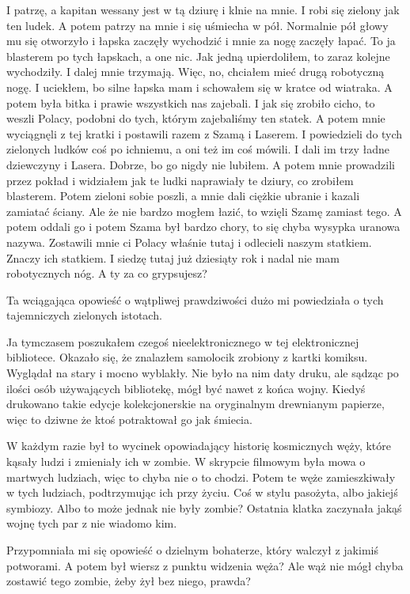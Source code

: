 \begin{poem}
	I patrzę, a kapitan wessany jest w tą dziurę i klnie na mnie. I robi się zielony jak ten ludek.
	A potem patrzy na mnie i się uśmiecha w pół. Normalnie pół głowy mu się otworzyło i łapska zaczęły wychodzić i mnie za nogę zaczęły łapać. 
	To ja blasterem po tych łapskach, a one nic. Jak jedną upierdoliłem, to zaraz kolejne wychodziły. I dalej mnie trzymają.
	Więc, no, chciałem mieć drugą robotyczną nogę.
	I uciekłem, bo silne łapska mam i schowałem się w kratce od wiatraka.
	A potem była bitka i prawie wszystkich nas zajebali.
	I jak się zrobiło cicho, to weszli Polacy, podobni do tych, którym zajebaliśmy ten statek.
	A potem mnie wyciągnęli z tej kratki i postawili razem z Szamą i Laserem.
	I powiedzieli do tych zielonych ludków coś po ichniemu, a oni też im coś mówili. I dali im trzy ładne dziewczyny i Lasera.
	Dobrze, bo go nigdy nie lubiłem.
	A potem mnie prowadzili przez pokład i widziałem jak te ludki naprawiały te dziury, co zrobiłem blasterem.
	Potem zieloni sobie poszli, a mnie dali ciężkie ubranie i kazali zamiatać ściany. Ale że nie bardzo mogłem łazić, to wzięli Szamę zamiast tego.
	A potem oddali go i potem Szama był bardzo chory, to się chyba wysypka uranowa nazywa.
	Zostawili mnie ci Polacy właśnie tutaj i odlecieli naszym statkiem. Znaczy ich statkiem.
	I siedzę tutaj już dziesiąty rok i nadal nie mam robotycznych nóg. A ty za co grypsujesz?
\end{poem}

Ta wciągająca opowieść o wątpliwej prawdziwości dużo mi powiedziała o tych tajemniczych zielonych istotach.

Ja tymczasem poszukałem czegoś nieelektronicznego w tej elektronicznej bibliotece.
Okazało się, że znalazłem samolocik zrobiony z kartki komiksu.
Wyglądał na stary i mocno wyblakły. Nie było na nim daty druku, ale sądząc po ilości osób używających bibliotekę, mógł być nawet z końca wojny.
Kiedyś drukowano takie edycje kolekcjonerskie na oryginalnym drewnianym papierze, więc to dziwne że ktoś potraktował go jak śmiecia.

W każdym razie był to wycinek opowiadający historię kosmicznych węży, które kąsały ludzi i zmieniały ich w zombie.
W skrypcie filmowym była mowa o martwych ludziach, więc to chyba nie o to chodzi.
Potem te węże zamieszkiwały w tych ludziach, podtrzymując ich przy życiu. Coś w stylu pasożyta, albo jakiejś symbiozy.
Albo to może jednak nie były zombie? 
Ostatnia klatka zaczynała jakąś wojnę tych par z nie wiadomo kim.

Przypomniała mi się opowieść o dzielnym bohaterze, który walczył z jakimiś potworami. 
A potem był wiersz z punktu widzenia węża? 
Ale wąż nie mógł chyba zostawić tego zombie, żeby żył bez niego, prawda?

